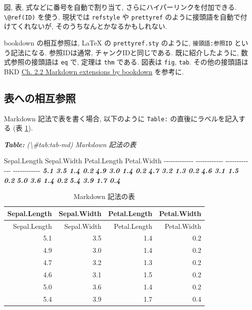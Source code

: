 \documentclass[
  nomag]{bxjsbook}
\newenvironment{Shaded}{\begin{snugshade}}{\end{snugshade}}
\newcommand{\AnnotationTok}[1]{\textcolor[rgb]{0.56,0.35,0.01}{\textbf{\textit{#1}}}}
\newcommand{\CommentTok}[1]{\textcolor[rgb]{0.56,0.35,0.01}{\textit{#1}}}
\newcommand{\InformationTok}[1]{\textcolor[rgb]{0.56,0.35,0.01}{\textbf{\textit{#1}}}}
\newcommand{\NormalTok}[1]{#1}
\theoremstyle{definition}
\theoremstyle{definition}
\theoremstyle{definition}
\theoremstyle{remark}
\begin{document}
図, 表, 式などに番号を自動で割り当て, さらにハイパーリンクを付加できる.
\texttt{\textbackslash{}@ref(ID)} を使う. 現状では \texttt{refstyle} や
\texttt{prettyref} のように接頭語を自動で付けてくれないが,
そのうちなんとかなるかもしれない.

bookdown の相互参照は, LaTeX の \texttt{prettyref.sty} のように,
\texttt{接頭語:参照ID} という記法になる. 参照IDは通常,
チャンクIDと同じである. 既に紹介したように, 数式参照の接頭語は
\texttt{eq} で, 定理は \texttt{thm} である. 図表は \texttt{fig},
\texttt{tab}. その他の接頭語は BKD
\href{https://bookdown.org/yihui/bookdown/markdown-extensions-by-bookdown.html\#equations}{Ch.
2.2 Markdown extensions by bookdown} を参考に.

\hypertarget{ux8868ux3078ux306eux76f8ux4e92ux53c2ux7167}{%
\subsection{表への相互参照}\label{ux8868ux3078ux306eux76f8ux4e92ux53c2ux7167}}

Markdown 記法で表を書く場合, 以下のように \texttt{Table:}
の直後にラベルを記入する (表 \ref{tab:tab-md}).

\begin{Shaded}
\begin{Highlighting}[]
\AnnotationTok{Table:}\CommentTok{ (\textbackslash{}\#tab:tab{-}md) Markdown 記法の表}

\NormalTok{ Sepal.Length   Sepal.Width   Petal.Length   Petal.Width}
\NormalTok{{-}{-}{-}{-}{-}{-}{-}{-}{-}{-}{-}{-}{-}  {-}{-}{-}{-}{-}{-}{-}{-}{-}{-}{-}{-}  {-}{-}{-}{-}{-}{-}{-}{-}{-}{-}{-}{-}{-}  {-}{-}{-}{-}{-}{-}{-}{-}{-}{-}{-}{-}}
\InformationTok{          5.1           3.5            1.4           0.2}
\InformationTok{          4.9           3.0            1.4           0.2}
\InformationTok{          4.7           3.2            1.3           0.2}
\InformationTok{          4.6           3.1            1.5           0.2}
\InformationTok{          5.0           3.6            1.4           0.2}
\InformationTok{          5.4           3.9            1.7           0.4}
\end{Highlighting}
\end{Shaded}

\begin{longtable}[]{@{}rrrr@{}}
\caption{\label{tab:tab-md} Markdown 記法の表}\tabularnewline
\toprule
Sepal.Length & Sepal.Width & Petal.Length & Petal.Width\tabularnewline
\midrule
\endfirsthead
\toprule
Sepal.Length & Sepal.Width & Petal.Length & Petal.Width\tabularnewline
\midrule
\endhead
5.1 & 3.5 & 1.4 & 0.2\tabularnewline
4.9 & 3.0 & 1.4 & 0.2\tabularnewline
4.7 & 3.2 & 1.3 & 0.2\tabularnewline
4.6 & 3.1 & 1.5 & 0.2\tabularnewline
5.0 & 3.6 & 1.4 & 0.2\tabularnewline
5.4 & 3.9 & 1.7 & 0.4\tabularnewline
\bottomrule
\end{longtable}
\end{document}
